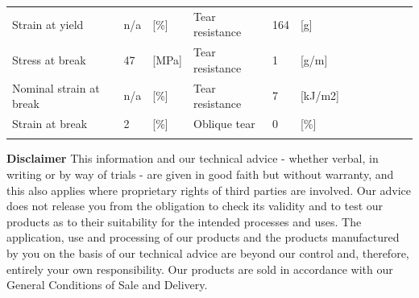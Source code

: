 \documentclass{article}
\begin{document}
\begin{center}
\begin{tabularx}{\textwidth}{ X l X l X l X l X l X l }
			Strain at yield                            & n/a                   & [\%]          & Tear resistance    & 164                   & [g]           \\
			\arrayrulecolor{line_color}\hline
			Stress at break                            & 47                    & [MPa]         & Tear resistance    & 1                     & [g/m]         \\
			\arrayrulecolor{line_color}\hline
			Nominal strain at break                    & n/a                   & [\%]          & Tear resistance    & 7                     & [kJ/m2]       \\
			\arrayrulecolor{line_color}\hline
			Strain at break                            & 2                     & [\%]          & Oblique tear       & 0                     & [\%]          \\
			\arrayrulecolor{line_color}\hline
		\end{tabularx}
\end{center}

\vspace*{\fill}
\footnotesize{
	\textbf{Disclaimer} This information and our technical advice - whether verbal, in writing or by way of trials - are given in good faith but without warranty, and this also applies
	where proprietary rights of third parties are involved. Our advice does not release you from the obligation to check its validity and to test our products as to their
	suitability for the intended processes and uses. The application, use and processing of our products and the products manufactured by you on the basis of our technical
	advice are beyond our control and, therefore, entirely your own responsibility. Our products are sold in accordance with our General Conditions of Sale and Delivery.
}
\end{document}
